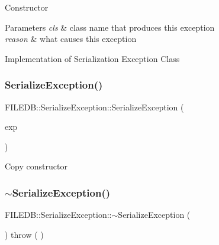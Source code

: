 Constructor 
\begin{DoxyParams}{Parameters}
{\em cls} & class name that produces this exception \\
\hline
{\em reason} & what causes this exception\\
\hline
\end{DoxyParams}
Implementation of Serialization Exception Class \mbox{\label{classFILEDB_1_1SerializeException_a4583fae246a4b2d2f468c3a4ec0ecb08}} 
\subsubsection{\texorpdfstring{SerializeException()}{SerializeException()}\hspace{0.1cm}{\footnotesize\ttfamily [2/6]}}
{\footnotesize\ttfamily F\+I\+L\+E\+D\+B\+::\+Serialize\+Exception\+::\+Serialize\+Exception (\begin{DoxyParamCaption}\item[{const \mbox{\hyperlink{classFILEDB_1_1SerializeException}{Serialize\+Exception}} \&}]{exp }\end{DoxyParamCaption})}

Copy constructor \mbox{\label{classFILEDB_1_1SerializeException_abd759712a4380483f2ff4f69e1159889}} 
\subsubsection{\texorpdfstring{$\sim$SerializeException()}{~SerializeException()}\hspace{0.1cm}{\footnotesize\ttfamily [1/2]}}
{\footnotesize\ttfamily F\+I\+L\+E\+D\+B\+::\+Serialize\+Exception\+::$\sim$\+Serialize\+Exception (\begin{DoxyParamCaption}\item[{void}]{ }\end{DoxyParamCaption}) throw ( ) \hspace{0.3cm}{\ttfamily [virtual]}}


